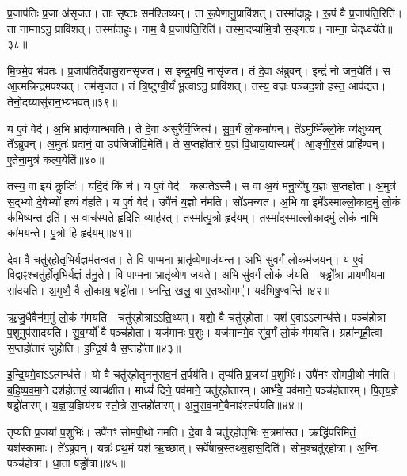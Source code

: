 प्र॒जा\-प॑तिः प्र॒जा अ॑\-सृजत।
ताः सृ॒ष्टाः सम॑श्लिष्यन्।
ता रू॒पेणानु॒प्रावि॑शत्।
तस्मा॑दाहुः।
रू॒पं वै प्र॒जा\-प॑ति॒रिति॑।
ता नाम्नाऽनु॒ प्रावि॑शत्।
तस्मा॑दाहुः।
नाम॒ वै प्र॒जा\-प॑ति॒रिति॑।
तस्मा॒दप्या॑मि॒त्रौ स॒ङ्गत्य॑।
नाम्ना॒ चेद्‌ध्वये॑ते॥३८॥

मि॒त्रमे॒व भ॑वतः।
प्र॒जा\-प॑तिर्देवासु॒रान॑\-सृजत।
स इन्द्र॒मपि॒ नासृ॑जत।
तं दे॒वा अ॑ब्रुवन्।
इन्द्रं॑ नो जन॒येति॑।
स आ॒त्मन्निन्द्र॑मपश्यत्।
तम॑\-सृजत।
तं त्रि॒ष्टुग्वी॒र्यं॑ भू॒त्वाऽनु॒ प्रावि॑शत्।
तस्य॒ वज्रः॑ पञ्चद॒शो हस्त॒ आप॑द्यत।
तेनो॒दय्यासु॑रान॒भ्य॑भवत्॥३९॥

य ए॒वं वेद॑।
अ॒भि भ्रातृ॑व्यान्भवति।
ते दे॒वा असु॑रैर्वि॒जित्य॑।
सु॒व॒र्गं लो॒कमा॑यन्।
ते॑ऽमुष्मिँ॑ल्लो॒के व्य॑क्षुध्यन्।
ते᳚ऽब्रुवन्।
अ॒मुतः॑ प्रदानं॒ वा उप॑जिजीवि॒मेति॑।
ते स॒प्तहो॑तारं य॒ज्ञं वि॒धाया॒यास्यम्᳚।
आ॒ङ्गी॒र॒सं प्राहि॑ण्वन्।
ए॒तेना॒मुत्र॑ कल्प॒येति॑॥४०॥

तस्य॒ वा इ॒यं कॢप्तिः॑।
यदि॒दं किं च॑।
य ए॒वं वेद॑।
कल्प॑ते\-ऽस्मै।
स वा अ॒यं म॑नु॒ष्ये॑षु य॒ज्ञः स॒प्तहो॑ता।
अ॒मुत्र॑ स॒द्भ्यो दे॒वेभ्यो॑ ह॒व्यं व॑हति।
य ए॒वं वेद॑।
उपै॑नं य॒ज्ञो न॑मति।
सो॑ऽमन्यत।
अ॒भि वा इ॒मे᳚\-ऽस्माल्लो॒काद॒मुं लो॒कं क॑मिष्यन्त॒ इति॑।
स वाच॑स्पते॒ हृदिति॒ व्याह॑रत्।
तस्मा᳚त्पु॒त्रो हृद॑यम्।
तस्मा॑द॒स्माल्लो॒काद॒मुं लो॒कं नाभि का॑मयन्ते।
पु॒त्रो हि हृद॑यम्॥४१॥\anuvakamend[ह्वये॑ते अभवत्कल्प॒येतीति॑ च॒त्वारि॑ च]

दे॒वा वै चतु॑र्‌\mbox{}होतृभिर्य॒ज्ञम॑तन्वत।
ते वि पा॒प्मना॒ भ्रातृ॑व्ये॒णाज॑यन्त।
अ॒भि सु॑व॒र्गं लो॒कम॑जयन्।
य ए॒वं वि॒द्वाꣴश्चतु॑र्\mbox{}होतृभिर्य॒ज्ञं त॑नु॒ते।
वि पा॒प्मना॒ भ्रातृ॑व्येण जयते।
अ॒भि सु॑व॒र्गं लो॒कं ज॑यति।
षड्ढो᳚त्रा प्राय॒णीय॒मा सा॑दयति।
अ॒मुष्मै॒ वै लो॒काय॒ षड्ढो॑ता।
घ्नन्ति॒ खलु॒ वा ए॒तथ्सोमम्᳚।
यद॑भिषु॒ण्वन्ति॑॥४२॥

ऋ॒जु॒धैवैन॑म॒मुं लो॒कं ग॑मयति।
चतु॑र्‌\mbox{}होत्रा\-ऽऽति॒थ्यम्।
यशो॒ वै चतु॑र्‌\mbox{}होता।
यश॑ ए॒वाऽऽत्मन्ध॑त्ते।
पञ्च॑होत्रा प॒शुमुप॑सादयति।
सु॒व॒र्ग्यो॑ वै पञ्च॑होता।
यज॑मानः प॒शुः।
यज॑मानमे॒व सु॑व॒र्गं लो॒कं ग॑मयति।
ग्रहा᳚न्गृही॒त्वा स॒प्तहो॑तारं जुहोति।
इ॒न्द्रि॒यं वै स॒प्तहो॑ता॥४३॥

इ॒न्द्रि॒यमे॒वाऽऽत्मन्ध॑त्ते।
यो वै चतु॑र्‌\mbox{}होतॄननुसव॒नं त॒र्पय॑ति।
तृप्य॑ति प्र॒जया॑ प॒शुभिः॑।
उपै॑नꣳ सोमपी॒थो न॑मति।
ब॒हि॒ष्प॒व॒मा॒ने दश॑होतारं॒ व्याच॑क्षीत।
माध्यं॑ दिने॒ पव॑माने॒ चतु॑र्‌\mbox{}होतारम्।
आर्भ॑वे॒ पव॑माने॒ पञ्च॑होतारम्।
पि॒तृ॒य॒ज्ञे षड्ढो॑तारम्।
य॒ज्ञा॒य॒ज्ञिय॑स्य स्तो॒त्रे स॒प्तहो॑तारम्।
अ॒नु॒स॒व॒नमे॒वैनाꣴ॑स्तर्पयति॥४४॥

तृप्य॑ति प्र॒जया॑ प॒शुभिः॑।
उपै॑नꣳ सोमपी॒थो न॑मति।
दे॒वा वै चतु॑र्‌\mbox{}होतृभिः स॒त्रमा॑सत।
ऋद्धि॑परिमितं॒ यश॑स्कामाः।
ते᳚ऽब्रुवन्।
यन्नः॑ प्रथ॒मं यश॑ ऋ॒च्छात्।
सर्वे॑षान्न॒स्तथ्स॒हास॒दिति॑।
सोम॒श्चतु॑र्‌\mbox{}होत्रा।
अ॒ग्निः पञ्च॑होत्रा।
धा॒ता षड्ढो᳚त्रा॥४५॥

